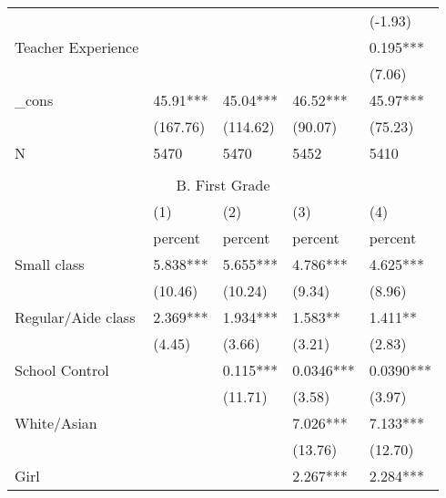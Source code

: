 \documentclass{article}
\begin{document}
{{{{{{{{{{{\begin{table}[htbp]
\begin{tabular}{lrllrr}
          &       &       &       & \multicolumn{1}{l}{} & \multicolumn{1}{l}{(-1.93)} \\
    \multicolumn{2}{l}{Teacher Experience} &       &       & \multicolumn{1}{l}{} & \multicolumn{1}{l}{0.195***} \\
          &       &       &       & \multicolumn{1}{l}{} & \multicolumn{1}{l}{(7.06)} \\
    \multicolumn{2}{l}{\_cons} & 45.91*** & 45.04*** & \multicolumn{1}{l}{46.52***} & \multicolumn{1}{l}{45.97***} \\
          &       & (167.76) & (114.62) & \multicolumn{1}{l}{(90.07)} & \multicolumn{1}{l}{(75.23)} \\
    \multicolumn{2}{l}{N} & 5470  & 5470  & \multicolumn{1}{l}{5452} & \multicolumn{1}{l}{5410} \\
          &       &       &       &       &  \\
    \multicolumn{6}{c}{B. First Grade} \\
    \midrule
          &       & (1)   & (2)   & \multicolumn{1}{l}{(3)} & \multicolumn{1}{l}{(4)} \\
    \midrule
          &       & percent & percent & \multicolumn{1}{l}{percent} & \multicolumn{1}{l}{percent} \\
    \multicolumn{2}{l}{Small class} & 5.838*** & 5.655*** & \multicolumn{1}{l}{4.786***} & \multicolumn{1}{l}{4.625***} \\
          &       & (10.46) & (10.24) & \multicolumn{1}{l}{(9.34)} & \multicolumn{1}{l}{(8.96)} \\
    \multicolumn{2}{l}{Regular/Aide class} & 2.369*** & 1.934*** & \multicolumn{1}{l}{1.583**} & \multicolumn{1}{l}{1.411**} \\
          &       & (4.45) & (3.66) & \multicolumn{1}{l}{(3.21)} & \multicolumn{1}{l}{(2.83)} \\
    \multicolumn{2}{l}{School Control} &       & 0.115*** & \multicolumn{1}{l}{0.0346***} & \multicolumn{1}{l}{0.0390***} \\
          &       &       & (11.71) & \multicolumn{1}{l}{(3.58)} & \multicolumn{1}{l}{(3.97)} \\
    \multicolumn{2}{l}{White/Asian} &       &       & \multicolumn{1}{l}{7.026***} & \multicolumn{1}{l}{7.133***} \\
          &       &       &       & \multicolumn{1}{l}{(13.76)} & \multicolumn{1}{l}{(12.70)} \\
    \multicolumn{2}{l}{Girl} &       &       & \multicolumn{1}{l}{2.267***} & \multicolumn{1}{l}{2.284***} \\

\end{tabular}
\end{table}}}}}}}}}}}}
\end{document}
